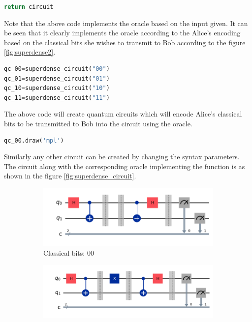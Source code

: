 \documentclass[12pt, oneside]{book}
\theoremstyle{definition}
\theoremstyle{definition}
\theoremstyle{remark}
\begin{document}
\begin{enumerate}
\begin{lstlisting}[language=Python]
    return circuit    
    \end{lstlisting}
    Note that the above code implements the oracle based on the input given. It can be seen that it clearly implements the oracle according to the Alice's encoding based on the classical bits she wishes to transmit to Bob according to the figure \ref{fig:superdense2}.
    \begin{lstlisting}[language=Python]
qc_00=superdense_circuit("00")
qc_01=superdense_circuit("01")
qc_10=superdense_circuit("10")
qc_11=superdense_circuit("11")
    \end{lstlisting}
    The above code will create quantum circuits which will encode Alice's classical bits to be transmitted to Bob into the circuit using the oracle.
    \begin{lstlisting}[language=Python]
qc_00.draw('mpl')
    \end{lstlisting}
    Similarly any other circuit can be created by changing the syntax parameters.
    The circuit along with the corresponding oracle implementing the function is as shown in the figure \ref{fig:superdense_circuit}.
     \begin{figure}[H]
        \centering
        \begin{subfigure}[b]{0.45\linewidth}
        \centering
        \includegraphics[width=1\linewidth]{../images/superdense_00.png}
        \caption{Classical bits: 00}
        \label{fig:superdense_00}
        \end{subfigure}
        \hfill
        \centering
        \begin{subfigure}[b]{0.45\linewidth}
        \centering
        \includegraphics[width=1\linewidth]{../images/superdense_01.png}

\end{subfigure}
\end{figure}
\end{enumerate}
\end{document}
